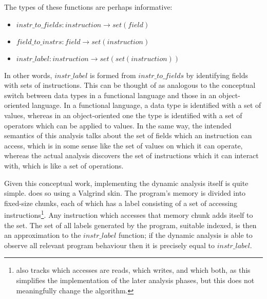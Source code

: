 The types of these functions are perhaps informative:

\begin{itemize}
\item $\mathit{instr\_to\_fields}: \mathit{instruction} \rightarrow \mathit{set}(\mathit{field})$
\item $\mathit{field\_to\_instrs}: \mathit{field} \rightarrow \mathit{set}(\mathit{instruction})$
\item $\mathit{instr\_label}: \mathit{instruction} \rightarrow \mathit{set}(\mathit{set}(\mathit{instruction}))$
\end{itemize}

In other words, $\mathit{instr\_label}$ is formed from
$\mathit{instr\_to\_fields}$ by identifying fields with sets of
instructions.  This can be thought of as analogous to the conceptual
switch between data types in a functional language and those in an
object-oriented language.  In a functional language, a data type is
identified with a set of values, whereas in an object-oriented one the
type is identified with a set of operators which can be applied to
values\needCite{}.  In the same way, the intended semantics of this
analysis talks about the set of fields which an instruction can
access, which is in some sense like the set of values on which it can
operate, whereas the actual analysis discovers the set of instructions
which it can interact with, which is like a set of operations.


Given this conceptual work, implementing the dynamic analysis itself
is quite simple.  {\Implementation} does so using a Valgrind
skin\needCite{}.  The program's memory is divided into fixed-size
chunks, each of which has a label consisting of a set of accessing
instructions\footnote{{\Implementation} also tracks which accesses are
  reads, which writes, and which both, as this simplifies the
  implementation of the later analysis phases, but this does not
  meaningfully change the algorithm.}.  Any instruction which accesses
that memory chunk adds itself to the set.  The set of all labels
generated by the program, suitable indexed, is then an approximation
to the $\mathit{instr\_label}$ function; if the dynamic analysis is
able to observe all relevant program behaviour then it is precisely
equal to $\mathit{instr\_label}$.

